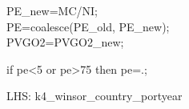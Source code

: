 

\usepackage[T1]{fontenc}




\thispagestyle{fancy}

\newcommand{\code}{\texttt}
\newcommand*{\Commonpath}{20190605}


PE\_new=MC/NI;\\
PE=coalesce(PE\_old, PE\_new);\\
PVGO2=PVGO2\_new;

if pe<5 or pe>75 then pe=.;

LHS: k4\_winsor\_country\_portyear





